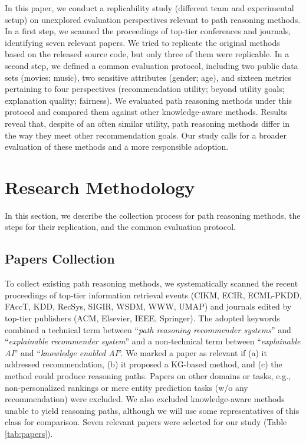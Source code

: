 \documentclass[runningheads]{llncs}
\begin{document}
In this paper, we conduct a replicability study (different team and experimental setup) on unexplored evaluation perspectives relevant to path reasoning methods. 
In a first step, we scanned the proceedings of top-tier conferences and journals, identifying seven relevant papers. 
We tried to replicate the original methods based on the released source code, but only three of them were replicable. 
In a second step, we defined a common evaluation protocol, including two public data sets (movies; music), two sensitive attributes (gender; age),
and sixteen metrics pertaining to four perspectives (recommendation utility; beyond utility goals; explanation quality; fairness). 
We evaluated path reasoning methods under this protocol and compared them against other knowledge-aware methods. 
Results reveal that, despite of an often similar utility, path reasoning methods differ in the way they meet other recommendation goals. 
Our study calls for a broader evaluation of these methods and a more responsible adoption.  

\section{Research Methodology}
In this section, we describe the collection process for path reasoning methods, the steps for their replication, and the common evaluation protocol.

\subsection{Papers Collection}
To collect existing path reasoning methods, we systematically scanned the recent proceedings of top-tier information retrieval events
(CIKM, ECIR, ECML-PKDD, FAccT, KDD, RecSys, SIGIR, WSDM, WWW, UMAP) 
and journals edited by top-tier publishers (ACM, Elsevier, IEEE, Springer). 
The adopted keywords combined a technical term between ``\emph{path reasoning recommender systems}'' and ``\emph{explainable recommender system}''
and a non-technical term between ``\emph{explainable AI}'' and ``\emph{knowledge enabled AI}''. 
We marked a paper as relevant if (a) it addressed recommendation, (b) it proposed a KG-based method, and (c) the method could produce reasoning paths. 
Papers on other domains or tasks, e.g., non-personalized rankings or mere entity prediction tasks (w/o any recommendation) were excluded. 
We also excluded knowledge-aware methods unable to yield reasoning paths, although we will use some representatives of this class for comparison.
Seven relevant papers were selected for our study (Table \ref{tab:papers}).
\end{document}
